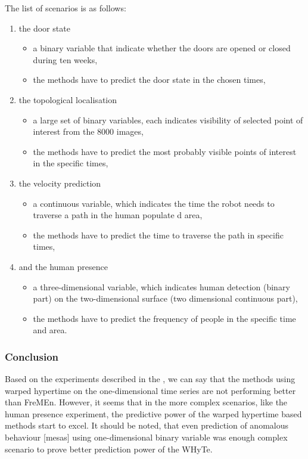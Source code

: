 The list of scenarios is as follows:
\begin{enumerate}
    \item the door state
    \begin{itemize}
        \item a binary variable that indicate whether the doors are opened or closed during ten weeks,
        \item the methods have to predict the door state in the chosen times,
    \end{itemize}
    \item the topological localisation
    \begin{itemize}
        \item a large set of binary variables, each indicates visibility of selected point of interest from the $8000$ images,
        \item the methods have to predict the most probably visible points of interest in the specific times,
    \end{itemize}
    \item the velocity prediction
    \begin{itemize}
        \item a continuous variable, which indicates the time the robot needs to traverse a path in the human populate
d area,
        \item the methods have to predict the time to traverse the path in specific times,
    \end{itemize}
    \item and the human presence
    \begin{itemize}
        \item a three-dimensional variable, which indicates human detection (binary part) on the two-dimensional surface (two dimensional continuous part),
        \item the methods have to predict the frequency of people in the specific time and area.
    \end{itemize}
\end{enumerate}

\subsubsection{Conclusion}

Based on the experiments described in the \cite{krajnik2018warped}, we can say that the methods using warped hypertime on the one-dimensional time series are not performing better than FreMEn.
However, it seems that in the more complex scenarios, like the human presence experiment, the predictive power of the warped hypertime based methods start to excel.
It should be noted, that even prediction of anomalous behaviour [mesas] using one-dimensional binary variable was
enough complex scenario to prove better prediction power of the WHyTe.

